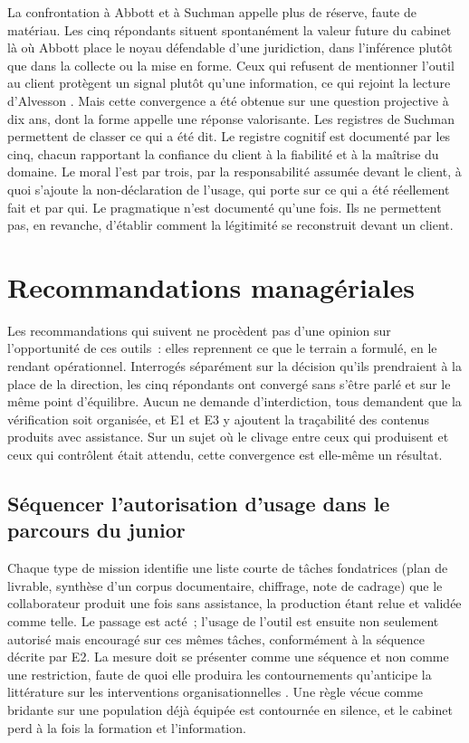 La confrontation à Abbott \cite{abbott1988} et à Suchman \cite{suchman1995} appelle plus de
réserve, faute de matériau. Les cinq répondants situent spontanément la valeur future du
cabinet là où Abbott place le noyau défendable d'une juridiction, dans l'inférence plutôt que
dans la collecte ou la mise en forme. Ceux qui refusent de mentionner l'outil au client
protègent un signal plutôt qu'une information, ce qui rejoint la lecture d'Alvesson
\cite{alvesson2001}. Mais cette convergence a été obtenue sur une question projective à dix
ans, dont la forme appelle une réponse valorisante. Les registres de Suchman permettent de
classer ce qui a été dit. Le registre cognitif est documenté par les cinq, chacun rapportant
la confiance du client à la fiabilité et à la maîtrise du domaine. Le moral l'est par trois,
par la responsabilité assumée devant le client, à quoi s'ajoute la non-déclaration de
l'usage, qui porte sur ce qui a été réellement fait et par qui. Le pragmatique n'est
documenté qu'une fois.
Ils ne permettent pas, en revanche, d'établir comment la légitimité se reconstruit devant
un client.

\section{Recommandations managériales}

Les recommandations qui suivent ne procèdent pas d'une opinion sur l'opportunité de ces
outils~: elles reprennent ce que le terrain a formulé, en le rendant opérationnel. Interrogés
séparément sur la décision qu'ils prendraient à la place de la direction, les cinq répondants
ont convergé sans s'être parlé et sur le même point d'équilibre. Aucun ne demande
d'interdiction, tous demandent que la vérification soit organisée, et E1 et E3 y ajoutent la
traçabilité des contenus produits avec assistance. Sur un
sujet où le clivage entre ceux qui produisent et ceux qui contrôlent était attendu, cette
convergence est elle-même un résultat.

\subsection{Séquencer l'autorisation d'usage dans le parcours du junior}

Chaque type de mission identifie une liste courte de tâches fondatrices (plan de livrable,
synthèse d'un corpus documentaire, chiffrage, note de cadrage) que le collaborateur produit
une fois sans assistance, la production étant relue et validée comme telle. Le passage est
acté~; l'usage de l'outil est ensuite non seulement autorisé mais encouragé sur ces mêmes
tâches, conformément à la séquence décrite par E2. La mesure doit se présenter comme une
séquence et non comme une restriction, faute de quoi elle produira les contournements
qu'anticipe la littérature sur les interventions organisationnelles \cite{venkatesh2008}.
Une règle vécue comme bridante sur une population déjà équipée est contournée en silence, et
le cabinet perd à la fois la formation et l'information.

